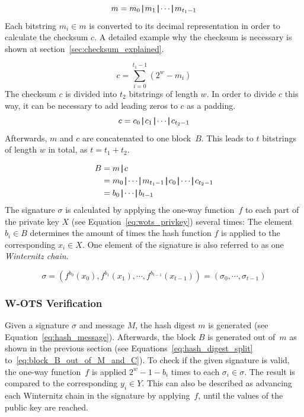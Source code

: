 \begin{equation}
\label{eq:hash_digest_split}
m = m_0 \operatorname{|\!\!|} m_1 \operatorname{|\!\!|} \cdots \operatorname{|\!\!|} m_{t_1-1}
\end{equation}
Each bitstring $m_i \in m$ is converted to its decimal representation in order to calculate the checksum $c$. A detailed example why the checksum is necessary is shown at section~\ref{sec:checksum_explained}. %

\begin{equation}
\label{eq:checksum_calculation}
c = \sum_{i = 0}^{t_{1}-1}(2^w-m_i)
\end{equation}
The checksum $c$ is divided into $t_2$ bitstrings of length $w$. In order to divide $c$ this way, it can be necessary to add leading zeros to $c$ as a padding.
\begin{equation}
c = c_0 \operatorname{|\!\!|} c_1 \operatorname{|\!\!|} \cdots \operatorname{|\!\!|} c_{t_2 - 1}
\end{equation}
Afterwards, $m$ and $c$ are concatenated to one block~$B$. This leads to $t$ bitstrings of length $w$ in total, as $t = t_1 + t_2$.

\begin{align}
\label{eq:block_B_out_of_M_and_C}
B &= m \concat c  \\ 
&= m_0 \concat \cdots \concat m_{t_1 - 1} \concat c_0 \concat \cdots \concat c_{t_2 - 1} \nonumber \\
&= b_0 \concat \cdots \concat b_{t-1} \nonumber
\end{align}
The signature $\sigma$ is calculated by applying the one-way function~$f$ to each part of the private key $X$ (see Equation~\ref{eq:wots_privkey}) several times: The element $b_i \in B$ determines the amount of times the hash function $f$ is applied to the corresponding $x_i \in X$. One element of the signature is also referred to as one \textit{Winternitz chain}.

\begin{equation}
\label{eq:wots_sign_calc}
\sigma = (f^{b_0}(x_0), f^{b_1}(x_1), \cdots, f^{b_{t-1}}(x_{t-1})) = (\sigma_0, \cdots, \sigma_{t-1})
\end{equation}

\subsubsection{W-OTS Verification}
\label{sec:wots-verification}
Given a signature $\sigma$ and message $M$, the hash digest $m$ is generated (see Equation~\ref{eq:hash_message}). Afterwards, the block $B$ is generated out of~$m$ as shown in the previous section (see Equations~\ref{eq:hash_digest_split} to~\ref{eq:block_B_out_of_M_and_C}). To check if the given signature is valid, the one-way function~$f$ is applied $2^w - 1 - b_i$ times to each $\sigma_i \in \sigma$. The result is compared to the corresponding $y_i \in Y$. This can also be described as advancing each Winternitz chain in the signature by applying~$f$, until the  values of the public key are reached.

